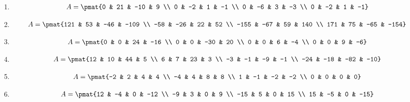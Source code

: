 \begin{enumerate}
\item

\begin{align*}
A = \pmat{0 & 21 & -10 & 9 \\ 0 & -2 & 1 & -1 \\ 0 & -6 & 3 & -3 \\ 0 & -2 & 1 & -1}
\end{align*}

\item

\begin{align*}
A = \pmat{121 & 53 & -46 & -109 \\ -58 & -26 & 22 & 52 \\ -155 & -67 & 59 & 140 \\ 171 & 75 & -65 & -154}
\end{align*}

\item

\begin{align*}
A = \pmat{0 & 0 & 24 & -16 \\ 0 & 0 & -30 & 20 \\ 0 & 0 & 6 & -4 \\ 0 & 0 & 9 & -6}
\end{align*}

\item

\begin{align*}
A = \pmat{12 & 10 & 44 & 5 \\ 6 & 7 & 23 & 3 \\ -3 & -1 & -9 & -1 \\ -24 & -18 & -82 & -10}
\end{align*}

\item

\begin{align*}
A = \pmat{-2 & 2 & 4 & 4 \\ -4 & 4 & 8 & 8 \\ 1 & -1 & -2 & -2 \\ 0 & 0 & 0 & 0}
\end{align*}

\item

\begin{align*}
A = \pmat{12 & -4 & 0 & -12 \\ -9 & 3 & 0 & 9 \\ -15 & 5 & 0 & 15 \\ 15 & -5 & 0 & -15}
\end{align*}


\end{enumerate}
